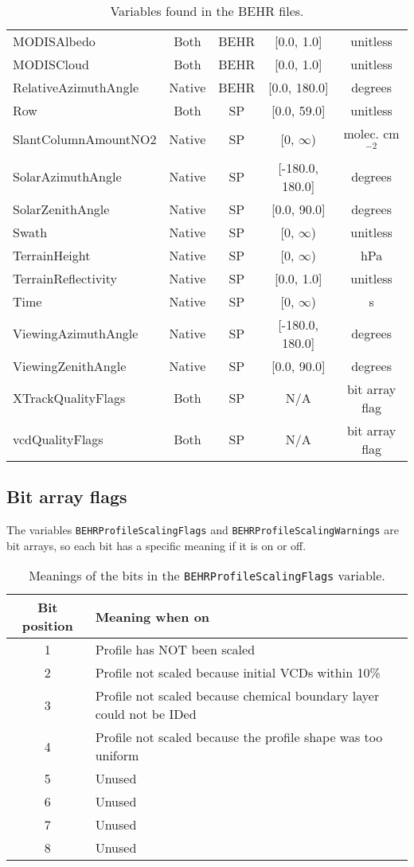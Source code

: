 \documentclass[12pt]{article}
\begin{document}
\begin{table}
\begin{center}
\begin{tabular}{lcccc}
	MODISAlbedo			&	Both		 	&	BEHR			&	[0.0, 1.0]	 & unitless \\
	MODISCloud			&	Both 		&	BEHR			&	[0.0, 1.0]	 & unitless \\
	RelativeAzimuthAngle &	Native	 	&	BEHR			&	[0.0, 180.0] & degrees \\
	Row					&	Both 		&	SP			&   [0.0, 59.0]	& unitless \\
	SlantColumnAmountNO2 & 	Native	 	&	SP			& 	[0, $\infty$) & molec. cm$^{-2}$ \\
	SolarAzimuthAngle	&	Native	 	&	SP			&	[-180.0, 180.0] & degrees \\
	SolarZenithAngle		&	Native	 	&	SP			&	[0.0, 90.0]		& degrees \\
	Swath				&	Native	 	&	SP			&	[0, $\infty$)	& unitless \\
	TerrainHeight		&	Native	 	& 	SP			&	[0, $\infty$) 	& hPa \\
	TerrainReflectivity	&	Native 		&	SP			&	[0.0, 1.0]		& unitless \\
	Time					&	Native	 	&	SP			&	[0, $\infty$)	& s \\
	ViewingAzimuthAngle	&	Native	 	&	SP			&	[-180.0, 180.0]	& degrees \\
	ViewingZenithAngle	&	Native	 	&	SP			&	[0.0, 90.0]		& degrees \\
	XTrackQualityFlags	&	Both 		&	SP			&	N/A				& bit array flag \\
	vcdQualityFlags		&	Both 		&	SP			&	N/A				& bit array flag \\
	\end{tabular}

	\end{center}
	\caption{Variables found in the BEHR files.}
	\label{tab:productvars}
	\end{table}

\FloatBarrier

\subsection{Bit array flags}
	The variables \texttt{BEHRProfileScalingFlags} and \texttt{BEHRProfileScalingWarnings} are bit arrays, so each bit has a specific meaning if it is on or off.
	
	\begin{table}
	\begin{tabular}{cl}
	Bit position & Meaning when on \\ \hline
	1		&	Profile has NOT been scaled \\
	2		&	Profile not scaled because initial VCDs within 10\% \\
	3		&	Profile not scaled because chemical boundary layer could not be IDed \\
	4		&	Profile not scaled because the profile shape was too uniform \\
	5		& 	Unused \\
	6		&	Unused \\
	7		&	Unused \\
	8		&	Unused
	\end{tabular}
	\caption{Meanings of the bits in the \texttt{BEHRProfileScalingFlags} variable.}
	\end{table}
	
\end{document}
